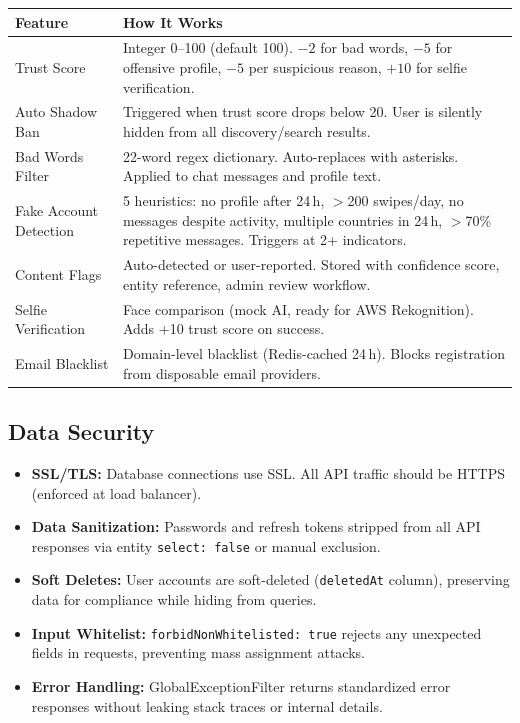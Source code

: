 \documentclass[a4paper,11pt]{article}
\begin{document}
\begin{longtable}{L{4.5cm} L{10.5cm}}
\toprule
\textbf{Feature} & \textbf{How It Works} \\
\midrule
\endhead
Trust Score & Integer 0--100 (default 100). $-2$ for bad words, $-5$ for offensive profile, $-5$ per suspicious reason, $+10$ for selfie verification. \\
\midrule
Auto Shadow Ban & Triggered when trust score drops below 20. User is silently hidden from all discovery/search results. \\
\midrule
Bad Words Filter & 22-word regex dictionary. Auto-replaces with asterisks. Applied to chat messages and profile text. \\
\midrule
Fake Account Detection & 5 heuristics: no profile after 24\,h, $>$200 swipes/day, no messages despite activity, multiple countries in 24\,h, $>$70\% repetitive messages. Triggers at 2+ indicators. \\
\midrule
Content Flags & Auto-detected or user-reported. Stored with confidence score, entity reference, admin review workflow. \\
\midrule
Selfie Verification & Face comparison (mock AI, ready for AWS Rekognition). Adds +10 trust score on success. \\
\midrule
Email Blacklist & Domain-level blacklist (Redis-cached 24\,h). Blocks registration from disposable email providers. \\
\bottomrule
\end{longtable}

\subsection{Data Security}

\begin{itemize}[leftmargin=1.5em]
    \item \textbf{SSL/TLS:} Database connections use SSL. All API traffic should be HTTPS (enforced at load balancer).
    \item \textbf{Data Sanitization:} Passwords and refresh tokens stripped from all API responses via entity \texttt{select: false} or manual exclusion.
    \item \textbf{Soft Deletes:} User accounts are soft-deleted (\texttt{deletedAt} column), preserving data for compliance while hiding from queries.
    \item \textbf{Input Whitelist:} \texttt{forbidNonWhitelisted: true} rejects any unexpected fields in requests, preventing mass assignment attacks.
    \item \textbf{Error Handling:} GlobalExceptionFilter returns standardized error responses without leaking stack traces or internal details.
\end{itemize}
\end{document}
